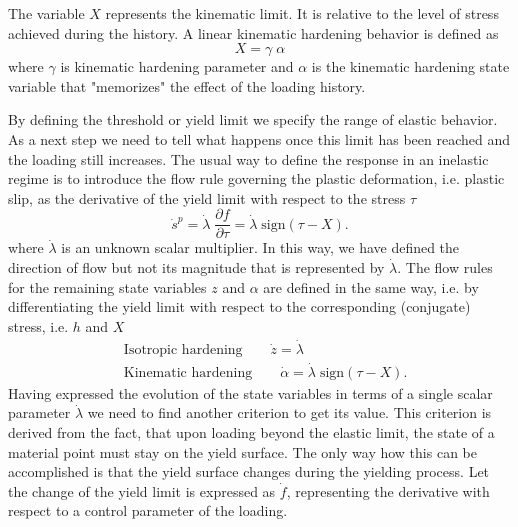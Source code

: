 \documentclass[main.tex]{subfiles}
\begin{document}
The variable $X$ represents the kinematic limit. It is relative to the level of stress achieved during 
the history. A linear kinematic 
hardening behavior is defined as 
\begin{equation}
X = \gamma \; \alpha
\end{equation}
where $\gamma$ is kinematic hardening parameter and $\alpha$ is the kinematic hardening state variable
that "memorizes" the effect of the  loading history.

By defining the threshold or yield limit we specify the range of elastic behavior. As a next step we need to tell what happens once this limit has been reached and the loading still increases. 
The usual way to define the response in an inelastic regime is to introduce the flow rule 
governing the plastic deformation, i.e. plastic slip, as the 
derivative of the yield limit with respect to the stress $\tau$
\begin{equation}
\label{eq:s_p}
\dot{s}^p = \dot{\lambda} \; \frac{\partial f}{\partial \tau} = \dot{\lambda} \; \mathrm{sign}(\tau - X).
\end{equation}
where $\dot{\lambda}$ is an unknown scalar multiplier. In this way, we have defined the direction of flow
but not its magnitude that is represented by $\dot{\lambda}$.
The flow rules for the remaining state variables $z$ and $\alpha$ 
are defined in the same way, i.e. by differentiating the yield limit with respect to the corresponding (conjugate) 
stress, i.e. $h$ and $X$
\begin{align}
\label{eq:isotropic_hardening}
& \mathrm{\mbox{Isotropic hardening}} \qquad \dot{z} = \dot{\lambda}\\
\label{eq:kinematic_hardening}
& \mathrm{\mbox{Kinematic hardening}} \qquad \dot{\alpha} = \dot{\lambda} \; \mathrm{sign}(\tau - X).
\end{align}
Having expressed the evolution of the state variables in terms of a single scalar parameter $\dot{\lambda}$
we need to find another criterion to get its value. This criterion is derived from the fact, that upon loading beyond the elastic limit, the state of a material point must stay on the yield surface. The only way how this can be accomplished is that the yield surface changes during the yielding process. Let the change of the yield limit is expressed as $\dot{f}$, representing the derivative with respect to a control parameter of the loading.
\end{document}

